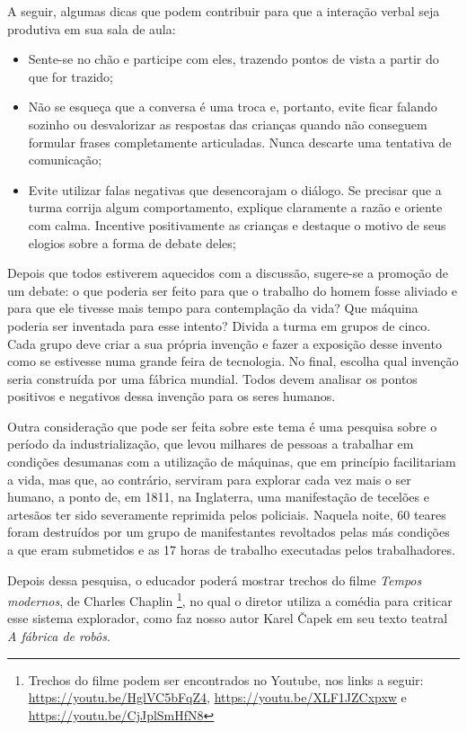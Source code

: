 \documentclass[11pt]{extarticle}
\begin{document}
A seguir, algumas dicas que podem contribuir para que a interação verbal seja produtiva em sua sala de aula: 

\begin{itemize}
\item Sente-se no chão e participe com eles, trazendo pontos de vista a partir do que for trazido;

\item Não se esqueça que a conversa é uma troca e, portanto, evite ficar falando sozinho ou desvalorizar as respostas das 
crianças quando não conseguem formular frases completamente articuladas. Nunca descarte uma tentativa de comunicação; 

\item Evite utilizar falas negativas que desencorajam o diálogo. Se precisar que a turma corrija algum comportamento, explique claramente a razão e oriente com calma. Incentive positivamente as crianças e destaque o motivo de seus elogios sobre a forma de debate deles; 

\end{itemize}

Depois que todos estiverem aquecidos com a discussão, sugere-se a promoção de um debate: o que poderia ser feito para que o trabalho do homem fosse aliviado e para que ele tivesse mais tempo para contemplação da vida? Que máquina poderia ser inventada para esse intento? Divida a turma em grupos de cinco. Cada grupo deve criar a sua própria invenção e fazer a exposição desse invento como se estivesse numa grande feira de tecnologia. No final, escolha qual invenção seria construída por uma fábrica mundial. Todos devem analisar os pontos positivos e negativos dessa invenção para os seres humanos.



Outra consideração que pode ser feita sobre este tema é uma pesquisa sobre o período da industrialização, que levou milhares de pessoas a trabalhar em condições desumanas com a utilização de máquinas, que em princípio facilitariam a vida, mas que, ao contrário, serviram para explorar cada vez mais o ser humano, a ponto de, em 1811, na Inglaterra, uma manifestação de tecelões e artesãos ter sido severamente reprimida pelos policiais. Naquela noite, 60 teares foram destruídos por um grupo de manifestantes revoltados pelas más condições a que eram submetidos e as 17 horas de trabalho executadas pelos trabalhadores. 

Depois dessa pesquisa, o educador poderá mostrar trechos do filme \textit{Tempos modernos}, de Charles Chaplin \footnote{Trechos do filme podem ser encontrados no Youtube, nos links a seguir: \url{https://youtu.be/HglVC5bFqZ4}, \url{https://youtu.be/XLF1JZCxpxw} e \url{https://youtu.be/CjJplSmHfN8}}, no qual o diretor utiliza a comédia para criticar esse sistema explorador, como faz nosso autor Karel Čapek em seu texto teatral \textit{A fábrica de robôs}. 
\end{document}
